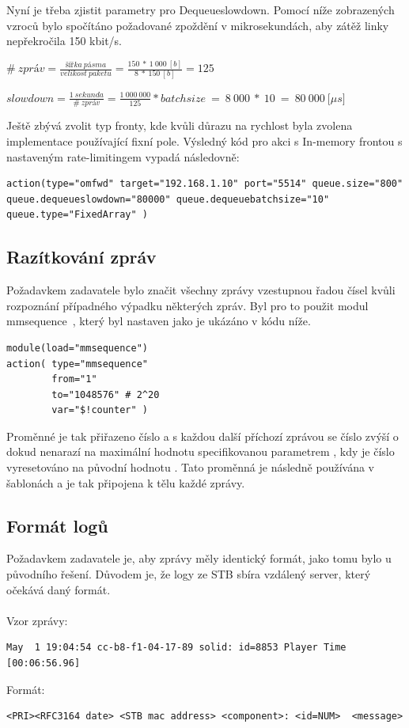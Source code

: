 \documentclass[thesis=B,czech]{FITthesis}[2012/06/26]
\begin{document}
Nyní je třeba zjistit parametry pro Dequeueslowdown. Pomocí níže zobrazených vzroců bylo spočítáno požadované zpoždění v mikrosekundách, aby zátěž linky nepřekročila 150 kbit/s.

\begin{description}
	\item $\#~zpráv=\frac{šířka~pásma}{velikost~paketu}=\frac{150~*~1~000~[b]}{8~*~150~[b]}=125$
	\item $slowdown=\frac{1~sekunda}{\#~zpráv}=\frac{1~000~000}{125}*batchsize~=~8~000~*~10~=~80~000~[\mu$$s]$
\end{description}
Ještě zbývá zvolit typ fronty, kde kvůli důrazu na rychlost byla zvolena implementace používající fixní pole.
Výsledný kód pro akci s In-memory frontou s nastaveným rate-limitingem vypadá následovně:
\begin{lstlisting}[style=RainerScriptSimpleStyle]
action(type="omfwd" target="192.168.1.10" port="5514" queue.size="800" queue.dequeueslowdown="80000" queue.dequeuebatchsize="10" queue.type="FixedArray" )
\end{lstlisting}

\subsection{Razítkování zpráv}
Požadavkem zadavatele bylo značit všechny zprávy vzestupnou řadou čísel kvůli rozpoznání případného výpadku některých zpráv.
Byl pro to použit modul mmsequence~\cite{RsyslogMmsequence}, který byl nastaven jako je ukázáno v kódu níže.
\begin{lstlisting}[style=RainerScriptSimpleStyle]
module(load="mmsequence")
action(	type="mmsequence"
		from="1"
		to="1048576" # 2^20
		var="$!counter" )
\end{lstlisting}
Proměnné  je tak přiřazeno číslo  a s každou další příchozí zprávou se číslo zvýší o  dokud nenarazí na maximální hodnotu specifikovanou parametrem , kdy je číslo vyresetováno na původní hodnotu .
Tato proměnná je následně používána v šablonách a je tak připojena k tělu každé zprávy.

\subsection{Formát logů}
Požadavkem zadavatele je, aby zprávy měly identický formát, jako tomu bylo u původního řešení. Důvodem je, že logy ze STB sbíra vzdálený server, který očekává daný formát.
\\
\\
Vzor zprávy:
\begin{lstlisting}[style=RainerScriptSimpleStyle]
May  1 19:04:54 cc-b8-f1-04-17-89 solid: id=8853 Player Time [00:06:56.96]
\end{lstlisting}
Formát:
\begin{lstlisting}[style=RainerScriptSimpleStyle]
<PRI><RFC3164 date> <STB mac address> <component>: <id=NUM>  <message>
\end{lstlisting}
\end{document}
